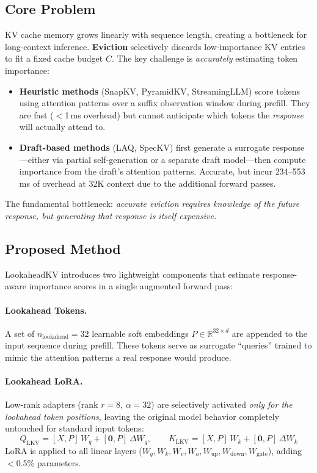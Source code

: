 \documentclass[11pt]{article}
\begin{document}
\subsection{Core Problem}
KV cache memory grows linearly with sequence length, creating a bottleneck for long-context inference.
\textbf{Eviction} selectively discards low-importance KV entries to fit a fixed cache budget $C$.
The key challenge is \emph{accurately} estimating token importance:

\begin{itemize}
    \item \textbf{Heuristic methods} (SnapKV, PyramidKV, StreamingLLM) score tokens using attention patterns over a suffix observation window during prefill. They are fast ($<$1\,ms overhead) but cannot anticipate which tokens the \emph{response} will actually attend to.
    \item \textbf{Draft-based methods} (LAQ, SpecKV) first generate a surrogate response---either via partial self-generation or a separate draft model---then compute importance from the draft's attention patterns. Accurate, but incur 234--553\,ms of overhead at 32K context due to the additional forward passes.
\end{itemize}

The fundamental bottleneck: \emph{accurate eviction requires knowledge of the future response, but generating that response is itself expensive.}

\subsection{Proposed Method}

LookaheadKV introduces two lightweight components that estimate response-aware importance scores in a single augmented forward pass:

\paragraph{Lookahead Tokens.}
A set of $n_{\mathrm{lookahead}} = 32$ learnable soft embeddings $P \in \mathbb{R}^{32 \times d}$ are appended to the input sequence during prefill. These tokens serve as surrogate ``queries'' trained to mimic the attention patterns a real response would produce.

\paragraph{Lookahead LoRA.}
Low-rank adapters (rank $r\!=\!8$, $\alpha\!=\!32$) are selectively activated \emph{only for the lookahead token positions}, leaving the original model behavior completely untouched for standard input tokens:
\[
Q_{\mathrm{LKV}} = [X, P]\,W_q + [\mathbf{0}, P]\,\Delta W_q, \qquad
K_{\mathrm{LKV}} = [X, P]\,W_k + [\mathbf{0}, P]\,\Delta W_k
\]
LoRA is applied to all linear layers ($W_q, W_k, W_v, W_o, W_{\mathrm{up}}, W_{\mathrm{down}}, W_{\mathrm{gate}}$), adding $<$0.5\% parameters.
\end{document}
